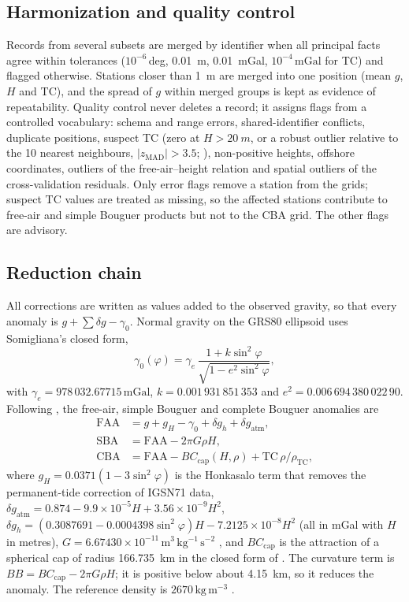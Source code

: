 \documentclass[11pt,a4paper]{article}
\newcommand{\mgal}{\ensuremath{\,\mathrm{mGal}}}
\newcommand{\kgm}{\ensuremath{\,\mathrm{kg\,m^{-3}}}}
\begin{document}
\subsection{Harmonization and quality control}

Records from several subsets are merged by identifier when all principal facts agree within tolerances ($10^{-6}$\,deg, \SI{0.01}{m}, \SI{0.01}{mGal}, $10^{-4}\mgal$ for TC) and flagged otherwise. Stations closer than \SI{1}{m} are merged into one position (mean $g$, $H$ and TC), and the spread of $g$ within merged groups is kept as evidence of repeatability. Quality control never deletes a record; it assigns flags from a controlled vocabulary: schema and range errors, shared-identifier conflicts, duplicate positions, suspect TC (zero at $H>\SI{20}{m}$, or a robust outlier relative to the 10 nearest neighbours, $|z_\mathrm{MAD}|>3.5$; \citealp{RousseeuwHubert2011}), non-positive heights, offshore coordinates, outliers of the free-air--height relation and spatial outliers of the cross-validation residuals. Only error flags remove a station from the grids; suspect TC values are treated as missing, so the affected stations contribute to free-air and simple Bouguer products but not to the CBA grid. The other flags are advisory.

\subsection{Reduction chain}

All corrections are written as values added to the observed gravity, so that every anomaly is $g+\sum\delta g-\gamma_0$. Normal gravity on the GRS80 ellipsoid \citep{Moritz2000} uses Somigliana's closed form,
\begin{equation}
\gamma_0(\varphi)=\gamma_e\,\frac{1+k\sin^2\varphi}{\sqrt{1-e^2\sin^2\varphi}},
\end{equation}
with $\gamma_e=978\,032.67715\mgal$, $k=0.001\,931\,851\,353$ and $e^2=0.006\,694\,380\,022\,90$. Following \citet{Hinze2005}, the free-air, simple Bouguer and complete Bouguer anomalies are
\begin{align}
\mathrm{FAA}&=g+g_H-\gamma_0+\delta g_h+\delta g_\mathrm{atm},\\
\mathrm{SBA}&=\mathrm{FAA}-2\pi G\rho H,\\
\mathrm{CBA}&=\mathrm{FAA}-BC_\mathrm{cap}(H,\rho)+\mathrm{TC}\,\rho/\rho_\mathrm{TC},
\end{align}
where $g_H=0.0371(1-3\sin^2\varphi)$ is the Honkasalo term that removes the permanent-tide correction of IGSN71 data, $\delta g_\mathrm{atm}=0.874-9.9\times10^{-5}H+3.56\times10^{-9}H^2$, $\delta g_h=(0.3087691-0.0004398\sin^2\varphi)H-7.2125\times10^{-8}H^2$ (all in mGal with $H$ in metres), $G=6.67430\times10^{-11}\,\mathrm{m^3\,kg^{-1}\,s^{-2}}$ \citep{Tiesinga2021}, and $BC_\mathrm{cap}$ is the attraction of a spherical cap of radius \SI{166.735}{km} in the closed form of \citet{LaFehr1991a}. The curvature term is $BB=BC_\mathrm{cap}-2\pi G\rho H$; it is positive below about \SI{4.15}{km}, so it reduces the anomaly. The reference density is $2670\kgm$ \citep{Hinze2003}.
\end{document}
